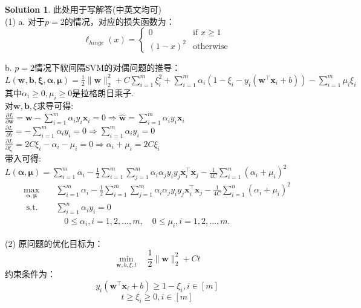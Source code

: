 \documentclass[a4paper,UTF8]{article}
\numberwithin{equation}{section}
\theoremstyle{definition}
\newtheorem*{solution}{Solution}
\def \w {\hat{\boldsymbol{w}}}
\def \x {\boldsymbol{x}}
\def \b {\mathbf{b}}
\newcommand{\vct}[1]{\boldsymbol{#1}} %
\newcommand{\vw}{\vct{w}}
\newcommand{\vx}{\vct{x}}
\begin{document}
\begin{solution}
此处用于写解答(中英文均可)\\
(1)
a. 对于$p=2$的情况，对应的损失函数为：
$$\ell_{hinge}(x) = \begin{cases} 0 & \text{if } x \geq 1 \\ (1-x)^2 & \text{otherwise} \end{cases}$$

b. $p=2$情况下软间隔SVM的对偶问题的推导：\\
$L(\vw,\b,\bm\xi,\bm\alpha,\bm\mu)=\frac{1}{2}\|\vw\|_{2}^{2}+C\sum_{i=1}^{m}\xi_{i}^{2}+\sum_{i=1}^{m}\alpha_{i}(1-\xi_{i}-y_{i}(\vw^{\top}\x_{i}+b))-\sum_{i=1}^{m}\mu_{i}\xi_{i}$\\
其中$\alpha_{i}\geq 0,\mu_{i}\geq 0$是拉格朗日乘子.\\
对$\vw,\b,\xi$求导可得:\\
$\frac{\partial L}{\partial \vw}=\vw-\sum_{i=1}^{m}\alpha_{i}y_{i}\x_{i}=0 \Rightarrow \w=\sum_{i=1}^{m}\alpha_{i}y_{i}\x_{i}$\\
$\frac{\partial L}{\partial b}=-\sum_{i=1}^{m}\alpha_{i}y_{i}=0 \Rightarrow \sum_{i=1}^{m}\alpha_{i}y_{i}=0$\\
$\frac{\partial L}{\partial \xi_{i}}=2C\xi_{i}-\alpha_{i}-\mu_{i}=0 \Rightarrow \alpha_{i}+\mu_{i}=2C\xi_{i}$\\
带入可得:\\
$L(\bm\alpha,\bm\mu)=\sum_{i=1}^{m}\alpha_{i}-\frac{1}{2}\sum_{i=1}^{m}\sum_{j=1}^{m}\alpha_{i}\alpha_{j}y_{i}y_{j}\x_{i}^{\top}\x_{j}-\frac{1}{4C}\sum_{i=1}^{n}(\alpha_{i}+\mu_{i})^{2}$\\



\begin{equation}
    \begin{aligned}
        \max _{\bm{\alpha},\bm{\mu}} \quad & \sum_{i=1}^{m}\alpha_{i}-\frac{1}{2}\sum_{i=1}^{m}\sum_{j=1}^{m}\alpha_{i}\alpha_{j}y_{i}y_{j}\x_{i}^{\top}\x_{j}-\frac{1}{4C}\sum_{i=1}^{n}(\alpha_{i}+\mu_{i})^{2} \\
        \text { s.t. } \quad & \sum_{i=1}^{n}\alpha_{i}y_{i}=0 \\
        & \quad 0\leq \alpha_{i},i=1,2,...,m, \quad 0\leq \mu_{i},i=1,2,...,m .
    \end{aligned}
\end{equation}

(2)
原问题的优化目标为：
$$\min _{\vw, b, \xi, t} \quad \frac{1}{2}\|\vw\|_{2}^{2}+Ct$$
约束条件为：
$$y_i(\vw^\top \vx_i + b) \geq 1-\xi_i, i \in [m]$$
$$t\geq \xi_i \geq 0, i \in [m]$$



\end{solution}
\end{document}
